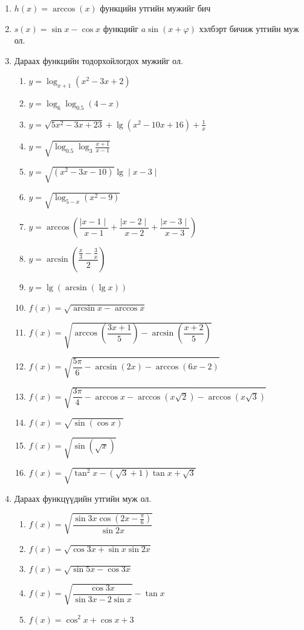 \begin{enumerate}
\item $h(x) = \arccos(x)$ функцийн утгийн мужийг бич
\item $s(x) = \sin x - \cos x$ функцийг $a\sin (x+\varphi)$ хэлбэрт бичиж утгийн муж ол.
\item Дараах функцийн тодорхойлогдох мужийг ол.
\begin{enumerate}
  \item $y = \log_{x+1}(x^2 - 3x + 2)$ 
  \item $y = \log_6\log_{0.5}(4-x)$ 
  \item $y = \sqrt{5x^2-3x+23}+\lg(x^2 - 10x +16)+\frac{1}{x}$
  \item $y = \sqrt{\log_{0.5}\log_{3}\frac{x+1}{x-1}}$ 
  \item $y = \sqrt{(x^2-3x-10)}\lg\mid x-3\mid $ 
  \item $y = \sqrt{\log_{5-x}(x^2 -9)}$ 
  \item $y = \arccos\!\left(\dfrac{\mid x-1\mid }{x-1} + \dfrac{\mid x-2\mid }{x-2} + \dfrac{\mid x-3\mid }{x-3}\right)$
  \item $y = \arcsin\!\left(\dfrac{\tfrac{x}{3} - \tfrac{3}{x}}{2}\right)$
  \item $y = \lg(\arcsin(\lg x))$
  \item $f(x) = \sqrt{\arcsin x - \arccos x}$
  \item $f(x) = \sqrt{\arccos\!\left(\dfrac{3x+1}{5}\right) - \arcsin\!\left(\dfrac{x+2}{5}\right)}$
  \item $f(x) = \sqrt{\dfrac{5\pi}{6} - \arcsin(2x) - \arccos(6x-2)}$
  \item $f(x) = \sqrt{\dfrac{3\pi}{4} - \arccos x - \arccos(x\sqrt{2}) - \arccos(x\sqrt{3})}$
  \item $f(x) = \sqrt{\sin(\cos x)}$
  \item $f(x) = \sqrt{\sin(\sqrt{x})}$
  \item $f(x) = \sqrt{\tan^2 x - (\sqrt{3}+1)\tan x + \sqrt{3}}$
\end{enumerate}
\item Дараах функцүүдийн утгийн муж ол.
\begin{enumerate}
    \item $f(x) = \sqrt{\dfrac{\sin 3x \cos\!\left(2x - \tfrac{\pi}{6}\right)}{\sin 2x}}$
  \item $f(x) = \sqrt{\cos 3x + \sin x \sin 2x}$
  \item $f(x) = \sqrt{\sin 5x - \cos 3x}$
  \item $f(x) = \sqrt{\dfrac{\cos 3x}{\sin 3x - 2\sin x}} - \tan x$
  \item $f(x) = \cos^2 x + \cos x + 3$

\end{enumerate}
\end{enumerate}
